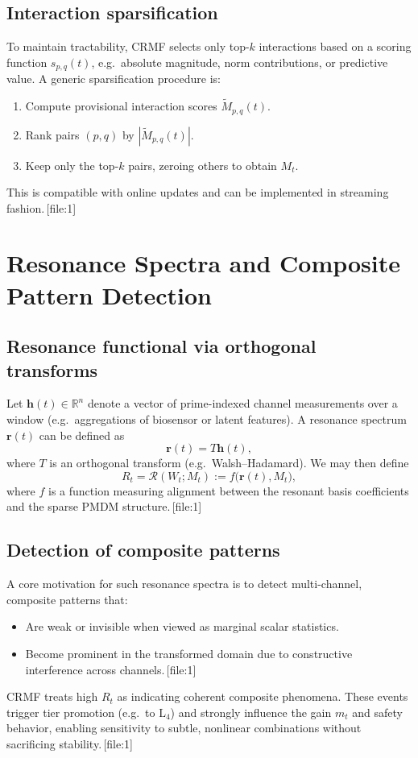 \documentclass[11pt]{article}
\begin{document}
\subsection{Interaction sparsification}

To maintain tractability, CRMF selects only top-$k$ interactions based on a scoring function $s_{p,q}(t)$, e.g.\ absolute magnitude, norm contributions, or predictive value.
A generic sparsification procedure is:
\begin{enumerate}[leftmargin=1.5em]
  \item Compute provisional interaction scores $\tilde{M}_{p,q}(t)$.
  \item Rank pairs $(p,q)$ by $|\tilde{M}_{p,q}(t)|$.
  \item Keep only the top-$k$ pairs, zeroing others to obtain $M_t$.
\end{enumerate}
This is compatible with online updates and can be implemented in streaming fashion.\,[file:1]

\section{Resonance Spectra and Composite Pattern Detection}

\subsection{Resonance functional via orthogonal transforms}

Let $\mathbf{h}(t) \in \mathbb{R}^{n}$ denote a vector of prime-indexed channel measurements over a window (e.g.\ aggregations of biosensor or latent features).
A resonance spectrum $\mathbf{r}(t)$ can be defined as
\[
  \mathbf{r}(t) = T \mathbf{h}(t),
\]
where $T$ is an orthogonal transform (e.g.\ Walsh--Hadamard).
We may then define
\[
  R_t = \mathcal{R}(W_t; M_t) := f\bigl(\mathbf{r}(t), M_t\bigr),
\]
where $f$ is a function measuring alignment between the resonant basis coefficients and the sparse PMDM structure.\,[file:1]

\subsection{Detection of composite patterns}

A core motivation for such resonance spectra is to detect multi-channel, composite patterns that:
\begin{itemize}[leftmargin=1.5em]
  \item Are weak or invisible when viewed as marginal scalar statistics.
  \item Become prominent in the transformed domain due to constructive interference across channels.\,[file:1]
\end{itemize}
CRMF treats high $R_t$ as indicating coherent composite phenomena.
These events trigger tier promotion (e.g.\ to $\mathrm{L}_4$) and strongly influence the gain $m_t$ and safety behavior, enabling sensitivity to subtle, nonlinear combinations without sacrificing stability.\,[file:1]
\end{document}
